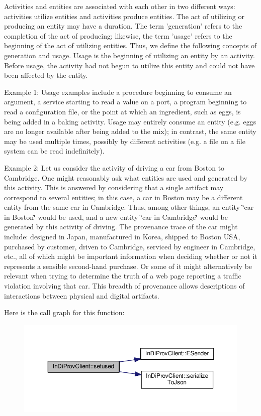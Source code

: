 Activities and entities are associated with each other in two different ways\-: activities utilize entities and activities produce entities. The act of utilizing or producing an entity may have a duration. The term 'generation' refers to the completion of the act of producing; likewise, the term 'usage' refers to the beginning of the act of utilizing entities. Thus, we define the following concepts of generation and usage. Usage is the beginning of utilizing an entity by an activity. Before usage, the activity had not begun to utilize this entity and could not have been affected by the entity.\par
 Example 1\-: Usage examples include a procedure beginning to consume an argument, a service starting to read a value on a port, a program beginning to read a configuration file, or the point at which an ingredient, such as eggs, is being added in a baking activity. Usage may entirely consume an entity (e.\-g. eggs are no longer available after being added to the mix); in contrast, the same entity may be used multiple times, possibly by different activities (e.\-g. a file on a file system can be read indefinitely).\par
 Example 2\-: Let us consider the activity of driving a car from Boston to Cambridge. One might reasonably ask what entities are used and generated by this activity. This is answered by considering that a single artifact may correspond to several entities; in this case, a car in Boston may be a different entity from the same car in Cambridge. Thus, among other things, an entity \char`\"{}car in Boston\char`\"{} would be used, and a new entity \char`\"{}car in Cambridge\char`\"{} would be generated by this activity of driving. The provenance trace of the car might include\-: designed in Japan, manufactured in Korea, shipped to Boston U\-S\-A, purchased by customer, driven to Cambridge, serviced by engineer in Cambridge, etc., all of which might be important information when deciding whether or not it represents a sensible second-\/hand purchase. Or some of it might alternatively be relevant when trying to determine the truth of a web page reporting a traffic violation involving that car. This breadth of provenance allows descriptions of interactions between physical and digital artifacts. 

Here is the call graph for this function\-:
\nopagebreak
\begin{figure}[H]
\begin{center}
\leavevmode
\includegraphics[width=350pt]{class_in_di_prov_client_ae33d7a1a44e8d4e7ebbf832271938bce_cgraph}
\end{center}
\end{figure}




